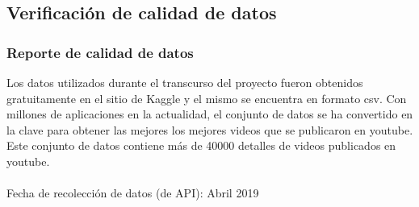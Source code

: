 \subsection{Verificación de calidad de datos}
    \subsubsection{Reporte de calidad de datos}
        Los datos utilizados durante el transcurso del proyecto fueron obtenidos
        gratuitamente en el sitio de Kaggle y el mismo se encuentra en formato csv.
        Con millones de aplicaciones en la actualidad, el conjunto de datos se
        ha convertido en la clave para obtener las mejores los mejores videos
        que se publicaron en youtube. Este conjunto de datos contiene más de
        40000 detalles de videos publicados en youtube.\\\\
        Fecha de recolección de datos (de API): Abril 2019
